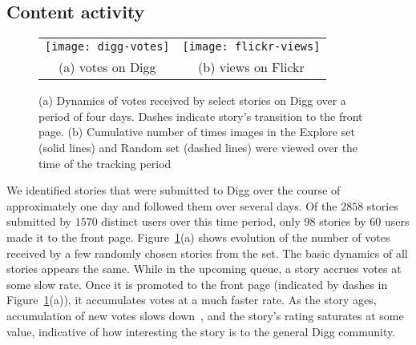 \documentclass[]{article}
\newcommand{\source}[1]{\textsf{#1}}
\newcommand{\figref}[1]{Figure~\ref{#1}}
\begin{document}
\subsection{Content activity}
\begin{figure}[tbh]
\begin{tabular}{cc}
  \texttt{[image: digg-votes]} &
  \texttt{[image: flickr-views]} \\
  (a) votes on Digg & (b) views on Flickr
  \end{tabular}
\caption{ (a) Dynamics of votes received by select stories on Digg over a period
of four days. Dashes indicate story's transition to the front page.
(b) Cumulative number of times images in the \source{Explore} set (solid lines) and
  \source{Random} set (dashed lines) were viewed over the time of the tracking period
} \label{fig:dynamics}
\end{figure}

We identified stories that were submitted to Digg over the course of
approximately one day and followed them over
several days. Of the $2858$ stories submitted by $1570$
distinct users over this time period, only 98 stories by 60 users
made it to the front page. \figref{fig:dynamics}(a) shows evolution of
the number of votes received by a few randomly chosen stories from the set.
The basic dynamics of all
stories appears the same. While in the upcoming queue, a story
accrues votes at some slow rate. Once it is promoted to the front page
(indicated by dashes in \figref{fig:dynamics}(a)),
it accumulates votes at a much faster rate. As the story ages,
accumulation of new votes slows down~\cite{Wu07}, and the story's rating
saturates at some value, indicative of how interesting the story is to the general Digg community.

\end{document}
